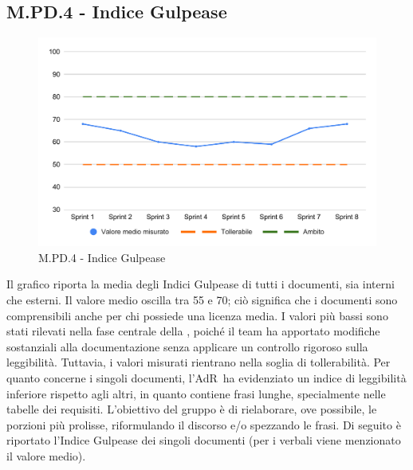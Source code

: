 \subsection{M.PD.4 - Indice Gulpease}
\begin{figure}[H]
    \centering
    \includegraphics[width=\textwidth]{assets/indice_gulpease.pdf}
    \caption{M.PD.4 - Indice Gulpease}
\end{figure}

\par Il grafico riporta la media degli Indici Gulpease di tutti i documenti, sia interni che esterni. Il valore medio oscilla tra 55 e 70; ciò significa che i documenti sono comprensibili anche per chi possiede una licenza media. I valori più bassi sono stati rilevati nella fase centrale della , poiché il team ha apportato modifiche sostanziali alla documentazione senza applicare un controllo rigoroso sulla leggibilità. Tuttavia, i valori misurati rientrano nella soglia di tollerabilità. Per quanto concerne i singoli documenti, l’AdR\ ha evidenziato un indice di leggibilità inferiore rispetto agli altri, in quanto contiene frasi lunghe, specialmente nelle tabelle dei requisiti. L’obiettivo del gruppo è di rielaborare, ove possibile, le porzioni più prolisse, riformulando il discorso e/o spezzando le frasi. Di seguito è riportato l’Indice Gulpease dei singoli documenti (per i verbali viene menzionato il valore medio).